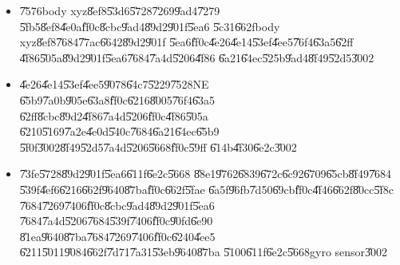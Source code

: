 \documentclass[12pt,a4paper]{article}
\begin{document}
\begin{itemize}
\item \U{7576}body xyz\U{8ef8}\U{53d6}\U{5728}\U{7269}\U{9ad4}\U{7279}%
\U{5fb5}\U{8ef8}\U{4e0a}\U{ff0c}\U{8cbc}\U{9ad4}\U{89d2}\U{901f}\U{5ea6}%
\U{5c31}\U{662f}body xyz\U{8ef8}\U{7684}\U{77ac}\U{6642}\U{89d2}\U{901f}%
\U{5ea6}\U{ff0c}\U{4e26}\U{4e14}\U{53ef}\U{4ee5}\U{76f4}\U{63a5}\U{62ff}%
\U{4f86}\U{505a}\U{89d2}\U{901f}\U{5ea6}\U{7684}\U{7a4d}\U{5206}\U{4f86}%
\U{6a21}\U{64ec}\U{525b}\U{9ad4}\U{8f49}\U{52d5}\U{3002}

\item \U{4e26}\U{4e14}\U{53ef}\U{4ee5}\U{9078}\U{64c7}\U{5229}\U{7528}NE%
\U{65b9}\U{7a0b}\U{905e}\U{63a8}\U{ff0c}\U{6216}\U{8005}\U{76f4}\U{63a5}%
\U{62ff}\U{8cbc}\U{89d2}\U{4f86}\U{7a4d}\U{5206}\U{ff0c}\U{4f86}\U{505a}%
\U{6210}\U{5169}\U{7a2e}\U{4e0d}\U{540c}\U{7684}\U{6a21}\U{64ec}\U{65b9}%
\U{5f0f}\U{3002}\U{8f49}\U{52d5}\U{7a4d}\U{5206}\U{5668}\U{ff0c}\U{59ff}%
\U{614b}\U{4f30}\U{6e2c}\U{3002}

\item \U{73fe}\U{5728}\U{89d2}\U{901f}\U{5ea6}\U{611f}\U{6e2c}\U{5668}%
\U{88e1}\U{9762}\U{6839}\U{672c}\U{6c92}\U{6709}\U{65cb}\U{8f49}\U{7684}%
\U{539f}\U{4ef6}\U{6216}\U{662f}\U{9640}\U{87ba}\U{ff0c}\U{662f}\U{5fae}%
\U{6a5f}\U{96fb}\U{7d50}\U{69cb}\U{ff0c}\U{4f46}\U{662f}\U{80cc}\U{5f8c}%
\U{7684}\U{7269}\U{7406}\U{ff0c}\U{8cbc}\U{9ad4}\U{89d2}\U{901f}\U{5ea6}%
\U{7684}\U{7a4d}\U{5206}\U{7684}\U{539f}\U{7406}\U{ff0c}\U{90fd}\U{6e90}%
\U{81ea}\U{9640}\U{87ba}\U{7684}\U{7269}\U{7406}\U{ff0c}\U{6240}\U{4ee5}%
\U{6211}\U{5011}\U{9084}\U{662f}\U{7d71}\U{7a31}\U{53eb}\U{9640}\U{87ba}%
\U{5100}\U{611f}\U{6e2c}\U{5668}gyro sensor\U{3002}
\end{itemize}

\bigskip

%

\bigskip

%

%

%
\end{document}
